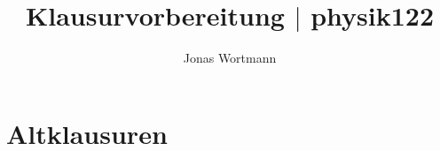 \documentclass[a4paper,12pt]{article}
\numberwithin{equation}{section}
\begin{document}

\title{Klausurvorbereitung $|$ physik122}
\author{Jonas Wortmann}
\maketitle
{}


\newpage



\fancyhead[L]{\thepage}
\fancyfoot[C]{}

\tableofcontents


\newpage


\fancyhead[R]{\leftmark\\\rightmark}


\section{Altklausuren}

\end{document}
